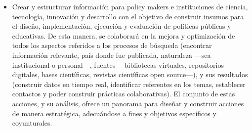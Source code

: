 \begin{itemize}
	\item Crear y estructurar información para policy makers e instituciones de ciencia, tecnología, innovación y desarrollo con el objetivo de construir insumos para el diseño, implementación, ejecución y evaluación de políticas públicas y educativas. De esta manera, se colaborará en la mejora y optimización de todos los aspectos referidos a los procesos de búsqueda (encontrar información relevante, país donde fue publicada, naturaleza ---sea institucional o personal---, fuentes ---bibliotecas virtuales, repositorios digitales, bases científicas, revistas científicas open source---), y sus resultados (construir datos en tiempo real, identificar referentes en los temas, establecer contactos y poder construir prácticas colaborativas). El conjunto de estas acciones, y su análisis, ofrece un panorama para diseñar y construir acciones de manera estratégica, adecuándose a fines y objetivos específicos y coyunturales.
\end{itemize}
